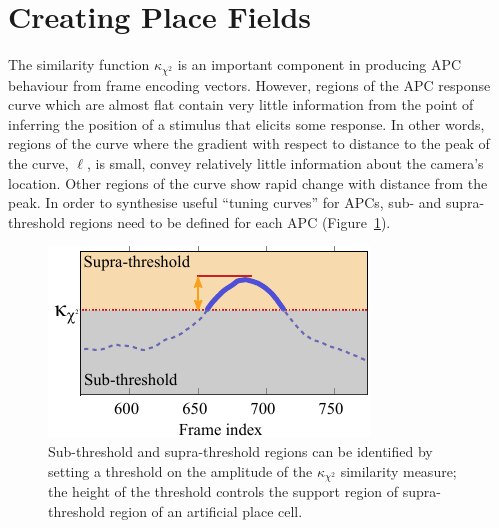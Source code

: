 \section{Creating Place Fields}

The similarity function $\kappa_{\chi^2}$ is an important component in producing APC behaviour from frame encoding vectors.  However, regions of the APC response curve which are almost flat contain very little information from the point of inferring the position of a stimulus that elicits some response. In other words, regions of the curve where the gradient with respect to distance to the peak of the curve, $\ell$, is small, convey relatively little information about the camera's location. Other regions of the curve show rapid change with distance from the peak. In order to synthesise useful ``tuning curves'' for APCs, sub- and supra-threshold regions need to be defined for each APC (Figure~\ref{fig:Supra}).

\begin{figure}
\centering
  \includegraphics[width=\linewidth]{gfx/Chapter05/tuning_curve-thresh.pdf}
\caption{Sub-threshold and supra-threshold regions can be identified by setting a threshold on the amplitude of the $\kappa_{\chi^2}$ similarity measure; the height of the threshold controls the support region of supra-threshold region of an artificial place cell.}
\label{fig:Supra}
\end{figure}




